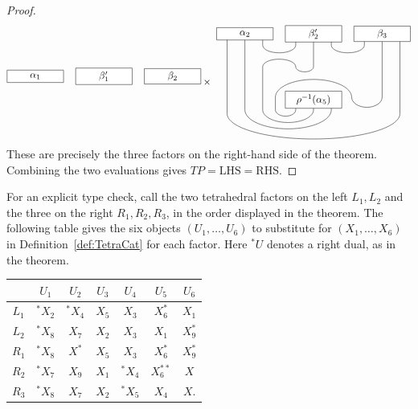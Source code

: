 \documentclass{amsart}
\begin{document}
\begin{proof}
\begin{align*}
{{\begin{tikzpicture}[scale=.9]
\draw (-2.1,2.6) node [draw,fill=white,minimum width=2cm] {$\alpha_1$};
\draw (0.6,2.6) node [draw,fill=white,minimum width=2cm] {$\beta'_1$};
\draw (3.3,2.6) node [draw,fill=white,minimum width=2cm] {$\beta_2$};
\end{tikzpicture}}}
\mathbin{\times}
\vcenter{\hbox{
\begin{tikzpicture}[scale=.9]
\draw (-.7+0.6,0)--++(0,-.4) node [left] {\tiny ${ }$} arc (0:-180:.4 and .25) --++(0,.5) arc (180:0:1.5 and .7) arc (-180:0:.6 and .4)  --++(0,2.5);
\draw (0+0.6,0)--++(0,-.4) node [right] {\tiny ${ }$} arc (0:-180:1 and .5) --++(0,1.7) arc (180:0:.65 and .3) arc (-180:0:.35 and .2) --++(0,1.3);
\draw (.7+0.6,0)--++(0,-.4) node [right] {\tiny ${ }$} arc (0:-180:1.7 and .75) --++(0,3);
\draw (-2.1-.7,2.6)--++(0,-.45) --++(0,-2.7) arc (-180:0:3.4 and 1);
\draw (-2.1+.7,2.6)--++(0,-.45) arc (-180:0:.65 and .3);
\draw (0.6-.7,2.6)--++(0,-.45)  node [left] {\tiny ${ }$};
\draw (0.6+.7,2.6)--++(0,-.45) arc (-180:0:.65 and .3);
\draw (3.3-.7,2.6)--++(0,-.45) node [left] {\tiny ${ }$};
\draw (3.3+.7,2.6)--++(0,-.45) node [right] {\tiny ${ }$} --++(0,-2.7);
\draw (0.6,0) node [draw,fill=white,minimum width=2cm] {$\rho^{-1}(\alpha_5)$};
\draw (-2.1,2.6) node [draw,fill=white,minimum width=2cm] {$\alpha_2$};
\draw (0.6,2.6) node [draw,fill=white,minimum width=2cm] {$\beta'_2$};
\draw (3.3,2.6) node [draw,fill=white,minimum width=2cm] {$\beta_3$};
\end{tikzpicture}}}
\end{align*}
These are precisely the three factors on the right-hand side of the theorem. Combining the two evaluations gives $TP=\mathrm{LHS}=\mathrm{RHS}$.
\end{proof}
For an explicit type check, call the two tetrahedral factors on the left $L_1,L_2$ and the three on the right $R_1,R_2,R_3$, in the order displayed in the theorem. The following table gives the six objects $(U_1,\ldots,U_6)$ to substitute for $(X_1,\ldots,X_6)$ in Definition~\ref{def:TetraCat} for each factor. Here ${}^*U$ denotes a right dual, as in the theorem.
\begin{center}
\renewcommand{\arraystretch}{1.2}
\begin{tabular}{c|cccccc}
 & $U_1$ & $U_2$ & $U_3$ & $U_4$ & $U_5$ & $U_6$\\\hline
$L_1$ & ${}^*X_2$ & ${}^*X_4$ & $X_5$ & $X_3$ & $X_6^*$ & $X_1$\\
$L_2$ & ${}^*X_8$ & $X_7$ & $X_2$ & $X_3$ & $X_1$ & $X_9^*$\\
$R_1$ & ${}^*X_8$ & $X^*$ & $X_5$ & $X_3$ & $X_6^*$ & $X_9^*$\\
$R_2$ & ${}^*X_7$ & $X_9$ & $X_1$ & ${}^*X_4$ & $X_6^{**}$ & $X$\\
$R_3$ & ${}^*X_8$ & $X_7$ & $X_2$ & ${}^*X_5$ & $X_4$ & $X$.
\end{tabular}
\end{center}
\end{document}
